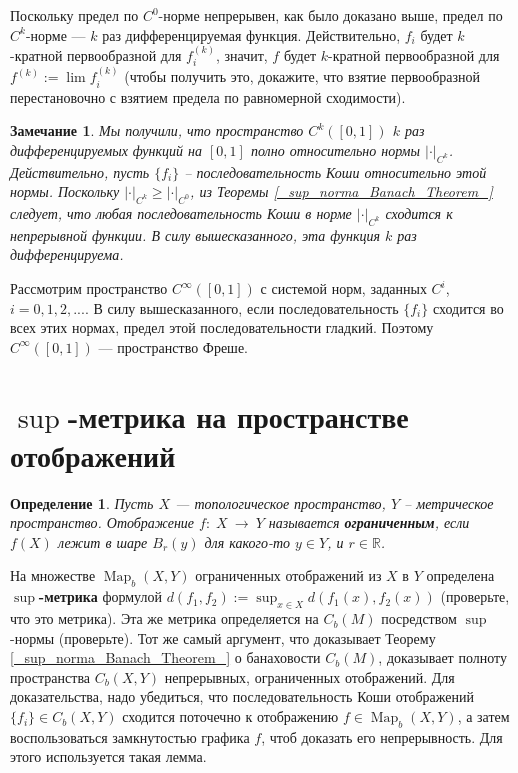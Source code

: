 \documentclass[12pt]{book}
\newcommand{\arrow}{{\:\longrightarrow\:}}
\def\Map{\operatorname{Map}}
\def\R{{\mathbb R}}
\theoremstyle{upshape}
\newtheorem{zadacha}{Задача}[chapter]
\theoremstyle{generic}
\newtheorem{opredelenie}[teorema]{Определение}
\newtheorem{remark}[teorema]{Замечание}
\def\замечание{\begin{remark}}
\def\еза{\end{remark}}
\theoremstyle{upshapenonumber}
\newcommand{\следствие}{%
     \refstepcounter{teorema}
     {\noindent\bf Следствие \thechapter.\arabic{teorema}:\ }}
\newcommand{\пример}{%
     \refstepcounter{teorema}
     {\noindent\bf Пример \thechapter.\arabic{teorema}:\ }}
\newcommand{\лемма}{%
     \refstepcounter{teorema}
     {\noindent\bf Лемма \thechapter.\arabic{teorema}:\ }}
\newcommand{\теорема}{%
     \refstepcounter{teorema}
     {\noindent\bf Теорема \thechapter.\arabic{teorema}:\ }}
\newcommand{\утверждение}{%
     \refstepcounter{teorema}
     {\noindent\bf Утверждение \thechapter.\arabic{teorema}:\ }}
\def\бф{\bf}
\def\ем{\em}
\def\задача{\begin{zadacha}}
\def\ез{\end{zadacha}}
\def\еу{\end{ukazanie}}
\def\определение{\begin{opredelenie}}
\def\ео{\end{opredelenie}}
\def\енум{\begin{enumerate}}
\def\ее{\end{enumerate}}
\begin{document}
Поскольку предел по $C^0$-норме
непрерывен, как было доказано выше, предел по
$C^k$-норме --- $k$ раз дифференцируемая функция.
Действительно, $f_i$ будет $k$-кратной первообразной
для $f_i^{(k)}$, значит, $f$ будет $k$-кратной первообразной
для $f^{(k)}:= \lim f_i^{(k)}$ (чтобы получить
это, докажите, что взятие первообразной
перестановочно с взятием предела по равномерной
сходимости).

\замечание
Мы получили, что пространство $C^k([0,1])$ $k$ раз дифференцируемых
функций на $[0,1]$  полно относительно нормы
$|\cdot|_{C^k}$. Действительно, пусть $\{f_i\}$ --
последовательность Коши относительно этой
нормы. Поскольку $|\cdot|_{C^k} \geq |\cdot|_{C^0}$,
из Теоремы \ref{_sup_norma_Banach_Theorem_} следует, что
любая последовательность Коши в норме $|\cdot|_{C^k}$
сходится к непрерывной функции. В силу вышесказанного,
эта функция $k$ раз дифференцируема.
\еза



Рассмотрим пространство $C^\infty([0,1])$
с системой норм, заданных $C^i$, $i=0,1, 2, ...$.
В силу вышесказанного, если последовательность 
$\{f_i\}$ сходится во всех этих нормах, предел
этой последовательности гладкий. 
Поэтому $C^\infty([0,1])$ --- пространство Фреше.



\section{$\sup$-метрика на пространстве отображений}


\определение
Пусть $X$ --- топологическое пространство, $Y$ --
метрическое пространство. Отображение $f:\; X \arrow Y$
называется {\бф ограниченным}, если $f(X)$ лежит
в шаре $B_r(y)$ для какого-то $y\in Y$,
и $r\in \R$.
\ео

На множестве $\Map_b(X,Y)$ ограниченных отображений
из $X$ в $Y$ определена {\бф $\sup$-метрика} формулой
$d(f_1, f_2):= \sup_{x\in X} d(f_1(x), f_2(x))$
(проверьте, что это метрика). Эта же метрика
определяется на $C_b(M)$ посредством $\sup$-нормы
(проверьте). Тот же самый аргумент, что доказывает
Теорему \ref{_sup_norma_Banach_Theorem_} о банаховости
$C_b(M)$, доказывает полноту пространства $C_b(X,Y)$
непрерывных, ограниченных отображений. Для доказательства,
надо убедиться, что последовательность Коши отображений
$\{f_i\}\in C_b(X,Y)$ сходится поточечно к отображению
$f\in\Map_b(X,Y)$, а затем воспользоваться 
замкнутостью графика $f$, чтоб доказать его 
непрерывность. Для этого используется такая
лемма.
\end{document}

